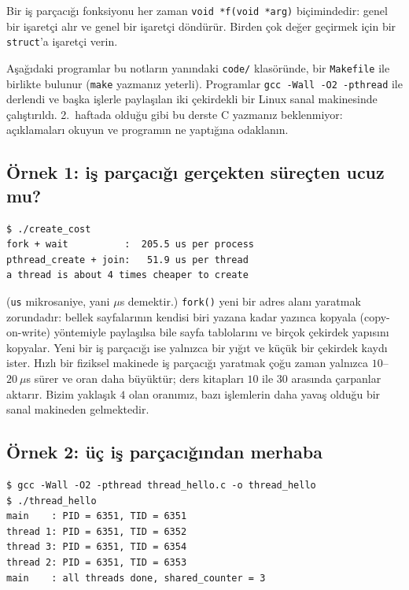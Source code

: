 \documentclass[11pt,a4paper]{article}
\newcommand{\cmd}[1]{\texttt{#1}}
\begin{document}
Bir iş parçacığı fonksiyonu her zaman \cmd{void *f(void *arg)} biçimindedir: genel bir işaretçi alır ve genel bir işaretçi döndürür. Birden çok değer geçirmek için bir \cmd{struct}'a işaretçi verin.

Aşağıdaki programlar bu notların yanındaki \texttt{code/} klasöründe, bir \texttt{Makefile} ile birlikte bulunur (\cmd{make} yazmanız yeterli). Programlar \cmd{gcc -Wall -O2 -pthread} ile derlendi ve başka işlerle paylaşılan iki çekirdekli bir Linux sanal makinesinde çalıştırıldı. 2.~haftada olduğu gibi bu derste C yazmanız beklenmiyor: açıklamaları okuyun ve programın ne yaptığına odaklanın.

\subsection{Örnek 1: iş parçacığı gerçekten süreçten ucuz mu?}
\label{sec:createcost}



\begin{lstlisting}[style=term]
$ ./create_cost
fork + wait          :  205.5 us per process
pthread_create + join:   51.9 us per thread
a thread is about 4 times cheaper to create
\end{lstlisting}

(\texttt{us} mikrosaniye, yani $\mu$s demektir.) \cmd{fork()} yeni bir adres alanı yaratmak zorundadır: bellek sayfalarının kendisi biri yazana kadar yazınca kopyala (copy-on-write) yöntemiyle paylaşılsa bile sayfa tablolarını ve birçok çekirdek yapısını kopyalar. Yeni bir iş parçacığı ise yalnızca bir yığıt ve küçük bir çekirdek kaydı ister. Hızlı bir fiziksel makinede iş parçacığı yaratmak çoğu zaman yalnızca $10$--$20\ \mu$s sürer ve oran daha büyüktür; ders kitapları $10$ ile $30$ arasında çarpanlar aktarır. Bizim yaklaşık $4$ olan oranımız, bazı işlemlerin daha yavaş olduğu bir sanal makineden gelmektedir.

\subsection{Örnek 2: üç iş parçacığından merhaba}



\begin{lstlisting}[style=term]
$ gcc -Wall -O2 -pthread thread_hello.c -o thread_hello
$ ./thread_hello
main    : PID = 6351, TID = 6351
thread 1: PID = 6351, TID = 6352
thread 3: PID = 6351, TID = 6354
thread 2: PID = 6351, TID = 6353
main    : all threads done, shared_counter = 3
\end{lstlisting}
\end{document}
